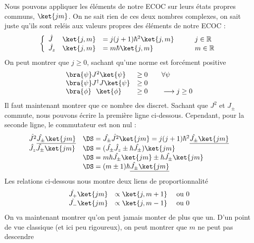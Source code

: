 Nous pouvons appliquer les éléments de notre ECOC sur leurs états propres communs, $\ket{jm}$. On 
ne sait rien de ces deux nombres complexes, on sait juste qu'ils sont reléis aux valeurs propres 
des éléments de notre ECOC :
\begin{equation}
\left\{\begin{array}{llll}
\hat{J} &\ket{j,m}&=j(j+1)\hbar^2\ket{j,m}&\qquad j\in\mathbb{R}\\
\hat{J_z} & \ket{j,m}&=m\hbar\ket{j,m}&\qquad m \in \mathbb{R}
\end{array}\right.
\end{equation}
On peut montrer que $j\geq 0$, sachant qu'une norme est forcément positive
\begin{equation}
\begin{array}{ll}
\bra{\psi}J^2\ket{\psi} &\geq 0\qquad\forall \psi\\
\bra{\psi}J^\dagger J\ket{\psi} &\geq 0\\
\bra{\phi}\ \ \ket{\phi} &\geq 0\qquad \longrightarrow j\geq 0
\end{array}
\end{equation}
Il faut maintenant montrer que ce nombre des discret. Sachant que $J^2$ et $J_\pm$ 
commute, nous pouvons écrire la première ligne ci-dessous. Cependant, pour la seconde 
ligne, le commutateur est non nul :
\begin{equation}
\begin{array}{ll}
\hat{J^2}\underline{\hat{J_\pm}\ket{jm}}&\DS = \hat{J_\pm}\hat{J^2}\ket{jm} =
 j(j+1)\hbar^2\underline{\hat{J_\pm}\ket{jm}}\\
\hat{J_z}\hat{J_\pm}\ket{jm}&\DS= (\hat{J_\pm}\hat{J_z}\pm\hbar\hat{J_\pm})\ket{jm}\\
&\DS= m\hbar\hat{J_\pm}\ket{jm}\pm \hbar\hat{J_\pm}\ket{jm}\\
&\DS= (m\pm 1)\hbar\underline{\hat{J_\pm}\ket{jm}}
\end{array}
\end{equation}
Les relations ci-dessous nous montre deux liens de proportionnalité
\begin{equation}
\begin{array}{ll}
\hat{J_+}\ket{jm} &\propto \ket{j,m+1}\quad \text{ ou } 0\\
\hat{J_-}\ket{jm} &\propto \ket{j,m-1}\quad \text{ ou } 0
\end{array}
\end{equation}
On va maintenant montrer qu'on peut jamais monter de plus que un. D'un point de vue 
classique (et ici peu rigoureux), on peut montrer que $m$ ne peut pas descendre 

